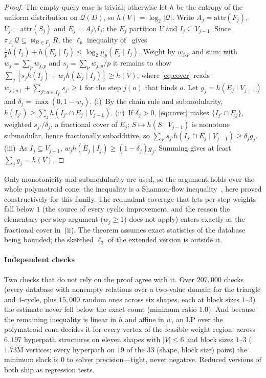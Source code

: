 \documentclass[sigconf, nonacm, acmthm=false]{acmart}
\newcommand{\query}{\mathcal{Q}}
\newcommand{\rel}{R}
\newcommand{\block}{F}
\newcommand{\interface}{I}
\newcommand{\joinstate}{S}
\newcommand{\muLp}[3]{\mu_{#1}(#2 \mid #3)}
\newcommand{\attr}[1]{\text{attr}(#1)}
\begin{document}
\begin{proof}
The empty-query case is trivial; otherwise let $h$ be the entropy of the uniform distribution on $\query(D)$, so
$h(V)=\log_2|\query|$. Write $A_j=\attr{\block_j}$,
$V_j=\attr{\joinstate_j}$ and $E_j=A_j\setminus\interface_j$: the $E_j$
partition $V$ and $\interface_j\subseteq V_{j-1}$. Since
$\pi_{A_j}\query\subseteq\bowtie_{\rel\in\block_j}\rel$, the $\ell_p$
inequality of~\cite{abokhamis2024lpnorm} gives
$\frac1p h(\interface_j)+h(E_j\mid\interface_j)\le
\log_2\muLp{p}{\block_j}{\interface_j}$. Weight by $w_{j,p}$ and sum; with
$w_j=\sum_p w_{j,p}$ and $s_j=\sum_p w_{j,p}/p$ it remains to show
$\sum_j[s_jh(\interface_j)+w_jh(E_j\mid\interface_j)]\ge h(V)$, where
\eqref{eq:cover} reads $w_{j(a)}+\sum_{j':a\in\interface_{j'}}s_{j'}\ge1$
for the step $j(a)$ that binds $a$. Let $g_j=h(E_j\mid V_{j-1})$ and
$\delta_j=\max(0,1-w_j)$. (i)~By the chain rule and submodularity,
$h(\interface_{j'})\ge\sum_j h(\interface_{j'}\cap E_j\mid V_{j-1})$.
(ii)~If $\delta_j>0$, \eqref{eq:cover} makes
$\{\interface_{j'}\cap E_j\}$, weighted $s_{j'}/\delta_j$, a fractional
cover of $E_j$; $S\mapsto h(S\mid V_{j-1})$ is monotone submodular, hence
fractionally subadditive, so
$\sum_{j'}s_{j'}h(\interface_{j'}\cap E_j\mid V_{j-1})\ge\delta_jg_j$.
(iii)~As $\interface_j\subseteq V_{j-1}$,
$w_jh(E_j\mid\interface_j)\ge(1-\delta_j)g_j$. Summing gives at least
$\sum_jg_j=h(V)$.
\end{proof}

Only monotonicity and submodularity are used, so the argument holds over
the whole polymatroid cone: the inequality is a Shannon-flow inequality~\cite{abokhamis2017panda}, here proved constructively for this
family. The redundant coverage that lets per-step
weights fall below $1$ (the source of every cyclic improvement, and the
reason the elementary per-step argument ($w_j\ge1$) does not apply) enters
exactly as the fractional cover in~(ii). The theorem assumes exact
statistics of the database being bounded; the sketched $\ell_2$ of the
extended version is outside it.

\paragraph{Independent checks} Two checks that do not rely on the proof
agree with it. Over $207{,}000$ checks (every database with nonempty relations over a two-value domain for the triangle and $4$-cycle, plus $15{,}000$ random ones across six shapes, each at block sizes $1$--$3$) the estimate never fell
below the exact count (minimum ratio $1.0$). And because the remaining
inequality is linear in $h$ and affine in $w$, an LP over the polymatroid
cone decides it for every vertex of the feasible weight region: across
$6{,}197$ hyperpath structures on eleven shapes with $|V|\le6$ and block
sizes $1$--$3$ ($1.73$M vertices; every hyperpath on $19$ of the $33$
(shape, block size) pairs) the minimum slack is $0$ to solver precision---tight, never negative. Reduced versions of both ship as regression tests.
\end{document}
